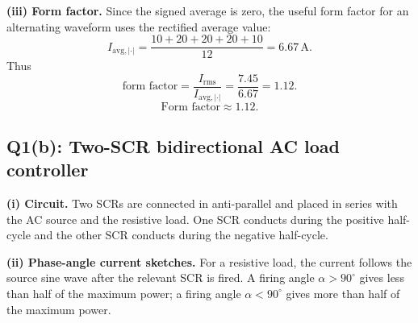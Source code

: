\documentclass[11pt,a4paper]{article}
\newcommand{\rms}{\mathrm{rms}}
\newcommand{\avg}{\mathrm{avg}}
\newcommand{\unit}[1]{\,\mathrm{#1}}
\newcommand{\answerbox}[1]{\[\boxed{#1}\]}
\begin{document}
\textbf{(iii) Form factor.} Since the signed average is zero, the useful form factor for an alternating waveform uses the rectified average value:
\[
I_{\avg,|\cdot|}=\frac{10+20+20+20+10}{12}=6.67\unit{A}.
\]
Thus
\[
\text{form factor}=\frac{I_{\rms}}{I_{\avg,|\cdot|}}
=\frac{7.45}{6.67}=1.12.
\]
\answerbox{\text{Form factor}\approx 1.12.}

\subsection*{Q1(b): Two-SCR bidirectional AC load controller}

\textbf{(i) Circuit.} Two SCRs are connected in anti-parallel and placed in series with the AC source and the resistive load. One SCR conducts during the positive half-cycle and the other SCR conducts during the negative half-cycle.

\begin{center}
\end{center}

\textbf{(ii) Phase-angle current sketches.} For a resistive load, the current follows the source sine wave after the relevant SCR is fired. A firing angle $\alpha>90^\circ$ gives less than half of the maximum power; a firing angle $\alpha<90^\circ$ gives more than half of the maximum power.
\end{document}
